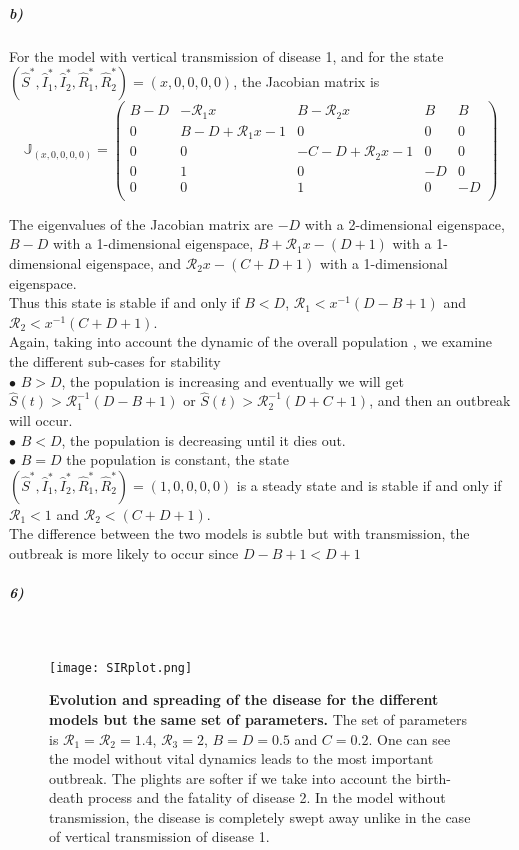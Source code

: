 \documentclass{article}
\begin{document}
\subparagraph{b)}
For the model with vertical transmission of disease 1, and for the state $(\widehat{S}^*,\widehat{I}_1^*,\widehat{I}_2^*,\widehat{R}_1^*,\widehat{R}_2^*)=(x,0,0,0,0)$, the Jacobian matrix is
$$
\mathbb{J}_{(x,0,0,0,0)}=
\left(
\begin{array}{ccccc}
 B-D & -\pmb{\mathcal{R}}_1 x & B-\pmb{\mathcal{R}}_2 x & B & B \\
 0 & B-D+\pmb{\mathcal{R}}_1 x-1 & 0 & 0 & 0 \\
 0 & 0 & -C-D+\pmb{\mathcal{R}}_2 x-1 & 0 & 0 \\
 0 & 1 & 0 & -D & 0 \\
 0 & 0 & 1 & 0 & -D \\
\end{array}
\right)
$$

The eigenvalues of the Jacobian matrix are $-D$ with a 2-dimensional eigenspace, $B-D$ with a 1-dimensional eigenspace, $B+\pmb{\mathcal{R}}_1 x-(D+1)$ with a 1-dimensional eigenspace, and $\pmb{\mathcal{R}}_2 x-(C+D+1)$ with a 1-dimensional eigenspace. \\

Thus this state is stable if and only if $B<D$, $\pmb{\mathcal{R}}_1<x^{-1}(D-B+1)$ and  $\pmb{\mathcal{R}}_2<x^{-1}(C+D+1)$.
\\
Again, taking into account the dynamic of the overall population , we examine the different sub-cases for stability \\

$\bullet$ $B>D$, the population is increasing and eventually we will get $\widehat{S}(t)>\pmb{\mathcal{R}}_1^{-1}(D-B+1)$ or $\widehat{S}(t)>\pmb{\mathcal{R}}_2^{-1}(D+C+1)$, and then an outbreak will occur.\\

$\bullet$ $B<D$, the population is decreasing until it dies out. \\

$\bullet$ $B=D$ the population is constant, the state $(\widehat{S}^*,\widehat{I}_1^*,\widehat{I}_2^*,\widehat{R}_1^*,\widehat{R}_2^*)=(1,0,0,0,0)$ is a steady state and is stable if and only if $\pmb{\mathcal{R}}_1<1$ and  $\pmb{\mathcal{R}}_2<(C+D+1)$. \\

The difference between the two models is subtle but with transmission, the outbreak is more likely to occur since $D-B+1<D+1$


\subparagraph{6)}
\

\begin{figure}[H]
	  \centering
  	\texttt{[image: SIRplot.png]}
  	\caption{\textbf{Evolution and spreading of the disease for the  different models but the same set of parameters.}  The set of parameters is $\pmb{\mathcal{R}}_1=\pmb{\mathcal{R}}_2=1.4$, $\pmb{\mathcal{R}}_3=2$, $B=D=0.5$ and $C=0.2$. One can see the model without vital dynamics leads to the most important outbreak. The plights are softer if we take into account the birth-death process and the fatality of disease 2. In the model without transmission, the disease is completely swept away unlike in the case  of vertical transmission of disease 1.}
	\end{figure}
\end{document}
